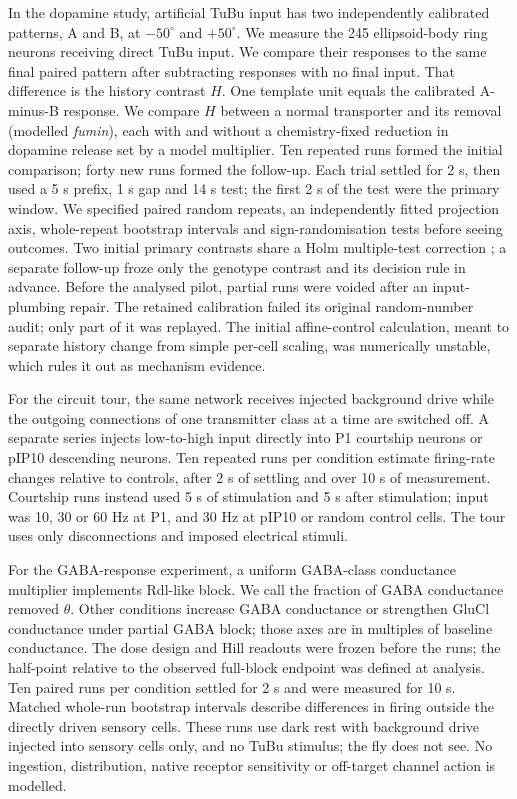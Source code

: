\documentclass[11pt]{article}
\begin{document}
In the dopamine study, artificial TuBu input has two independently calibrated patterns, A and B, at $-50^\circ$ and $+50^\circ$. We measure the 245 ellipsoid-body ring neurons receiving direct TuBu input. We compare their responses to the same final paired pattern after subtracting responses with no final input. That difference is the history contrast $H$. One template unit equals the calibrated A-minus-B response. We compare $H$ between a normal transporter and its removal (modelled \textit{fumin}), each with and without a chemistry-fixed reduction in dopamine release set by a model multiplier. Ten repeated runs formed the initial comparison; forty new runs formed the follow-up. Each trial settled for 2 s, then used a 5 s prefix, 1 s gap and 14 s test; the first 2 s of the test were the primary window. We specified paired random repeats, an independently fitted projection axis, whole-repeat bootstrap intervals \cite{efron} and sign-randomisation tests \cite{ernst} before seeing outcomes. Two initial primary contrasts share a Holm multiple-test correction \cite{holm}; a separate follow-up froze only the genotype contrast and its decision rule in advance. Before the analysed pilot, partial runs were voided after an input-plumbing repair. The retained calibration failed its original random-number audit; only part of it was replayed. The initial affine-control calculation, meant to separate history change from simple per-cell scaling, was numerically unstable, which rules it out as mechanism evidence.

For the circuit tour, the same network receives injected background drive while the outgoing connections of one transmitter class at a time are switched off. A separate series injects low-to-high input directly into P1 courtship neurons or pIP10 descending neurons. Ten repeated runs per condition estimate firing-rate changes relative to controls, after 2 s of settling and over 10 s of measurement. Courtship runs instead used 5 s of stimulation and 5 s after stimulation; input was 10, 30 or 60 Hz at P1, and 30 Hz at pIP10 or random control cells. The tour uses only disconnections and imposed electrical stimuli.

For the GABA-response experiment, a uniform GABA-class conductance multiplier implements Rdl-like block. We call the fraction of GABA conductance removed $\theta$. Other conditions increase GABA conductance or strengthen GluCl conductance under partial GABA block; those axes are in multiples of baseline conductance. The dose design and Hill readouts were frozen before the runs; the half-point relative to the observed full-block endpoint was defined at analysis. Ten paired runs per condition settled for 2 s and were measured for 10 s. Matched whole-run bootstrap intervals describe differences in firing outside the directly driven sensory cells. These runs use dark rest with background drive injected into sensory cells only, and no TuBu stimulus; the fly does not see. No ingestion, distribution, native receptor sensitivity or off-target channel action is modelled.
\end{document}

